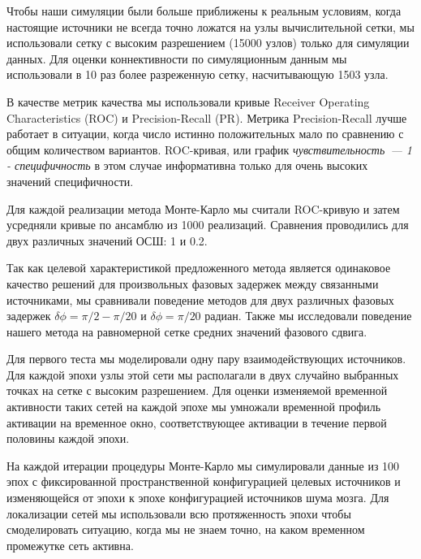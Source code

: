 Чтобы наши симуляции были больше приближены к реальным условиям, когда настоящие источники
не всегда точно ложатся на узлы вычислительной сетки, мы использовали сетку с высоким
разрешением (15000 узлов) только для симуляции данных. Для оценки
коннективности по симуляционным данным мы использовали в 10 раз более разреженную сетку,
насчитывающую 1503 узла.

В качестве метрик качества мы использовали кривые Receiver Operating Characteristics (ROC)
и Precision-Recall (PR). Метрика Precision-Recall лучше работает в ситуации, когда
число истинно положительных мало по сравнению с общим количеством вариантов.
ROC-кривая, или график \emph{чувствительность~--- 1 - специфичность} в этом случае информативна
только для очень высоких значений специфичности.

Для каждой реализации метода Монте-Карло мы считали ROC-кривую и затем
усредняли кривые по ансамблю из 1000 реализаций. Сравнения проводились для двух различных
значений ОСШ: 1 и 0.2.

Так как целевой характеристикой предложенного метода является одинаковое качество
решений для произвольных фазовых задержек между связанными источниками, мы сравнивали
поведение методов для двух различных фазовых задержек $\delta\phi=\pi/2-\pi/20$ и
$\delta\phi=\pi/20$ радиан. Также мы исследовали поведение нашего метода на
равномерной сетке средних значений фазового сдвига.

Для первого теста мы моделировали одну пару взаимодействующих источников. Для каждой эпохи
узлы этой сети мы располагали в двух случайно выбранных точках на сетке с высоким разрешением.
Для оценки изменяемой временной активности таких сетей на каждой эпохе мы умножали временной
профиль активации на временное окно, соответствующее активации в течение первой половины
каждой эпохи. %

На каждой итерации процедуры Монте-Карло мы симулировали данные из 100 эпох с фиксированной
пространственной конфигурацией целевых источников и изменяющейся от эпохи к эпохе конфигурацией
источников шума мозга. Для локализации сетей мы использовали всю протяженность эпохи
чтобы смоделировать ситуацию, когда мы не знаем точно, на каком временном промежутке
сеть активна.

